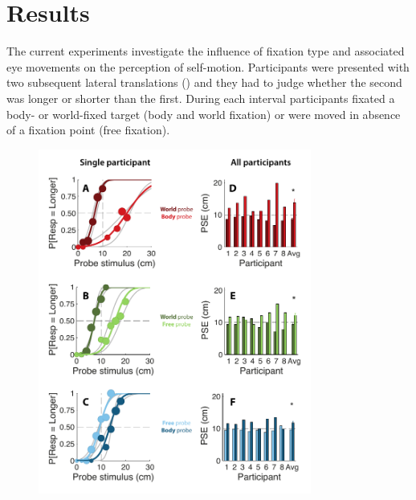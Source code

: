 
\section{Results}

The current experiments investigate the influence of fixation type and associated eye movements on the perception of self-motion. Participants were presented with two subsequent lateral translations () and they had to judge whether the second was longer or shorter than the first. During each interval participants fixated a body- or world-fixed target (body and world fixation) or were moved in absence of a fixation point (free fixation).

\begin{figure}
    \includegraphics[width=0.8\textwidth]{src/paper3/figure2.pdf}


\end{figure}

